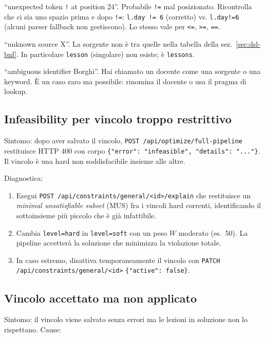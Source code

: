 \begin{erroricomunibox}
``unexpected token \texttt{!} at position 24''. Probabile
\texttt{!=} mal posizionato. Ricontrolla che ci sia uno spazio
prima e dopo \texttt{!=}: \texttt{l.day != 6} (corretto) vs.
\texttt{l.day!=6} (alcuni parser fallback non gestiscono).
Lo stesso vale per \texttt{<=}, \texttt{>=}, \texttt{==}.

``unknown source X''. La sorgente non \`e tra quelle nella
tabella della sez.~\ref{sec:dsl-bnf}. In particolare
\texttt{lesson} (singolare) non esiste; \`e \texttt{lessons}.

``ambiguous identifier Borghi''. Hai chiamato un docente come
una sorgente o una keyword. \`E un caso raro ma possibile:
rinomina il docente o usa il pragma di lookup.
\end{erroricomunibox}

\subsection{Infeasibility per vincolo troppo restrittivo}

Sintomo: dopo aver salvato il vincolo, \texttt{POST
/api/optimize/full-pipeline} restituisce HTTP 400 con corpo
\texttt{\{"error": "infeasible", "details": "..."\}}.\,Il vincolo
\`e una hard non soddisfacibile insieme alle altre.

Diagnostica:
\begin{enumerate}
\item Esegui \texttt{POST /api/constraints/general/<id>/explain}
  che restituisce un \emph{minimal unsatisfiable subset} (MUS)
  fra i vincoli hard correnti, identificando il sottoinsieme
  pi\`u piccolo che \`e gi\`a infattibile.
\item Cambia \texttt{level=hard} in \texttt{level=soft} con
  un peso $W$ moderato (es.\ 50). La pipeline accetter\`a la
  soluzione che minimizza la violazione totale.
\item In caso estremo, disattiva temporaneamente il vincolo
  con \texttt{PATCH /api/constraints/general/<id>}
  \texttt{\{"active": false\}}.
\end{enumerate}

\subsection{Vincolo accettato ma non applicato}

Sintomo: il vincolo viene salvato senza errori ma le lezioni
in soluzione non lo rispettano. Cause:

